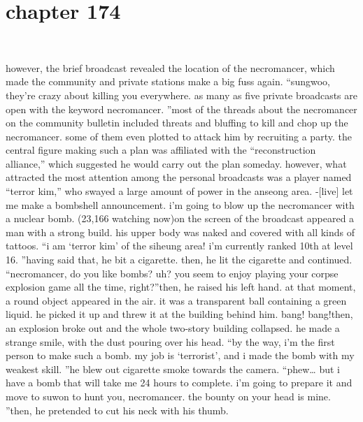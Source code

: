 \section{chapter 174}

                             




however, the brief broadcast revealed the location of the necromancer, which made the community and private stations make a big fuss again.
“sungwoo, they’re crazy about killing you everywhere.
 as many as five private broadcasts are open with the keyword necromancer.
”most of the threads about the necromancer on the community bulletin included threats and bluffing to kill and chop up the necromancer.
 some of them even plotted to attack him by recruiting a party.
 the central figure making such a plan was affiliated with the “reconstruction alliance,” which suggested he would carry out the plan someday.
however, what attracted the most attention among the personal broadcasts was a player named “terror kim,” who swayed a large amount of power in the anseong area.
-[live] let me make a bombshell announcement.
 i’m going to blow up the necromancer with a nuclear bomb.
 (23,166 watching now)on the screen of the broadcast appeared a man with a strong build.
 his upper body was naked and covered with all kinds of tattoos.
“i am ‘terror kim’ of the siheung area! i’m currently ranked 10th at level 16.
”having said that, he bit a cigarette.
 then, he lit the cigarette and continued.
“necromancer, do you like bombs? uh? you seem to enjoy playing your corpse explosion game all the time, right?”then, he raised his left hand.
 at that moment, a round object appeared in the air.
it was a transparent ball containing a green liquid.
he picked it up and threw it at the building behind him.
bang! bang!then, an explosion broke out and the whole two-story building collapsed.
 he made a strange smile, with the dust pouring over his head.
“by the way, i’m the first person to make such a bomb.
 my job is ‘terrorist’, and i made the bomb with my weakest skill.
”he blew out cigarette smoke towards the camera.
“phew… but i have a bomb that will take me 24 hours to complete.
 i’m going to prepare it and move to suwon to hunt you, necromancer.
 the bounty on your head is mine.
”then, he pretended to cut his neck with his thumb.

